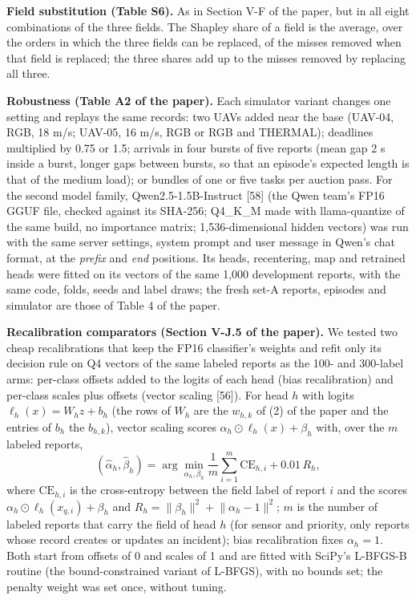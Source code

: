 \documentclass[10pt]{article}
\begin{document}
\textbf{Field substitution (Table S6).} As in Section V-F of the paper, but in all eight combinations of the three fields. The Shapley share of a field is the average, over the orders in which the three fields can be replaced, of the misses removed when that field is replaced; the three shares add up to the misses removed by replacing all three.

\textbf{Robustness (Table A2 of the paper).} Each simulator variant changes one setting and replays the same records: two UAVs added near the base (UAV-04, RGB, 18 m/s; UAV-05, 16 m/s, RGB or RGB and THERMAL); deadlines multiplied by 0.75 or 1.5; arrivals in four bursts of five reports (mean gap 2 s inside a burst, longer gaps between bursts, so that an episode's expected length is that of the medium load); or bundles of one or five tasks per auction pass. For the second model family, Qwen2.5-1.5B-Instruct [58] (the Qwen team's FP16 GGUF file, checked against its SHA-256; Q4\_K\_M made with llama-quantize of the same build, no importance matrix; 1,536-dimensional hidden vectors) was run with the same server settings, system prompt and user message in Qwen's chat format, at the \textit{prefix} and \textit{end} positions. Its heads, recentering, map and retrained heads were fitted on its vectors of the same 1,000 development reports, with the same code, folds, seeds and label draws; the fresh set-A reports, episodes and simulator are those of Table 4 of the paper.

\textbf{Recalibration comparators (Section V-J.5 of the paper).} We tested two cheap recalibrations that keep the FP16 classifier's weights and refit only its decision rule on Q4 vectors of the same labeled reports as the 100- and 300-label arms: per-class offsets added to the logits of each head (bias recalibration) and per-class scales plus offsets (vector scaling [56]). For head \(h\) with logits \(\ell_h(x) = W_h z + b_h\) (the rows of \(W_h\) are the \(w_{h,k}\) of (2) of the paper and the entries of \(b_h\) the \(b_{h,k}\)), vector scaling scores \(\alpha_h \odot \ell_h(x) + \beta_h\) with, over the \(m\) labeled reports,
\begin{equation}(\hat{\alpha}_h, \hat{\beta}_h) = \arg\min_{\alpha_h, \beta_h} \frac{1}{ m }\sum_{i=1}^m \mathrm{CE}_{h,i} + 0.01\, R_h,\label{eq:S1}\end{equation}
where \(\mathrm{CE}_{h,i}\) is the cross-entropy between the field label of report \(i\) and the scores \(\alpha_h \odot \ell_h(x_{q,i}) + \beta_h\) and \(R_h = \lVert \beta_h \rVert^2 + \lVert \alpha_h - 1 \rVert^2\); \(m\) is the number of labeled reports that carry the field of head \(h\) (for sensor and priority, only reports whose record creates or updates an incident); bias recalibration fixes \(\alpha_h = 1\). Both start from offsets of 0 and scales of 1 and are fitted with SciPy's L-BFGS-B routine (the bound-constrained variant of L-BFGS), with no bounds set; the penalty weight was set once, without tuning.
\end{document}
